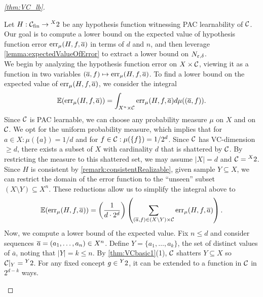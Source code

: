 \begin{proof}[\cref{thm:VC_lb}]
\begin{outline}
\0 Let $H:\mathcal{C}_{\text{fin}} \rightarrow \prescript{X}{}{2}$ be any hypothesis function witnessing PAC learnability of $\mathcal{C}$. Our goal is to compute a lower bound on the expected value of hypothesis function error $\operatorname{err}_\mu(H,f,\overline{a})$ in terms of $d$ and $n$, and then leverage \cref{lemma:expectedValueOfError} to extract a lower bound on $N_{\varepsilon,\delta}$.\\
    \1 We begin by analyzing the hypothesis function error on $X\times \mathcal{C}$, viewing it as a function in two variables $(\overline{a},f)\mapsto \operatorname{err}_\mu(H,f,\overline{a})$. To find a lower bound on the expected value of $\operatorname{err}_\mu(H,f,\overline{a})$, we consider the integral
        $$\operatorname{\mathbb{E}}(\operatorname{err}_\mu(H,f,\overline{a}))=\int_{X^n\times \mathcal{C}} \operatorname{err}_\mu(H,f,\overline{a}) d\mu((\overline{a},f)).$$
        \2 Since $\mathcal{C}$ is PAC learnable, we can choose any probability measure $\mu$ on $X$ and on $\mathcal{C}$. We opt for the uniform probability measure, which implies that for $a\in X: \mu(\{a\}) = 1/d$ and for $f\in\mathcal{C}: \mu(\{f\})=1/2^d$. 
        \2 Since $\mathcal{C}$ has VC-dimension $\geq d$, there exists a subset of $X$ with cardinality $d$ that is shattered by $\mathcal{C}$. By restricting the measure to this shattered set, we may assume $|X|=d$ and $\mathcal{C}=\prescript{X}{}{2}$.
        \2 Since $H$ is consistent by \cref{remark:consistentRealizable}, given sample $Y\subseteq X$, we can restrict the domain of the error function to the \enquote{unseen} subset $(X\setminus Y)\subseteq X^n$.
        \2 These reductions allow us to simplify the integral above to 
        $$\operatorname{\mathbb{E}}(\operatorname{err}_\mu(H,f,\overline{a}))=\left(\frac{1}{d\cdot 2^d}\right) \left(\sum_{(\overline{a},f)\in (X\setminus Y)\times \mathcal{C}} \operatorname{err}_\mu(H,f,\overline{a})\right).$$
    \1 Now, we compute a lower bound of the expected value.
        \2 Fix $n\leq d$ and consider sequences $\overline{a} = (a_1,\ldots,a_n) \in X^n$. Define $Y = \{ a_1, \ldots, a_k\}$, the set of distinct values of $\overline{a}$, noting that $|Y|=k\leq n$.
        \2 By \cref{thm:VCbasic1}(1), $\mathcal{C}$ shatters $Y\subseteq X$ so $\mathcal{C}|_Y = \prescript{Y}{}{2}$. For any fixed concept $g\in \prescript{Y}{}{2}$, it can be extended to a function in $\mathcal{C}$ in $2^{d-k}$ ways.

\end{outline}
\end{proof}
